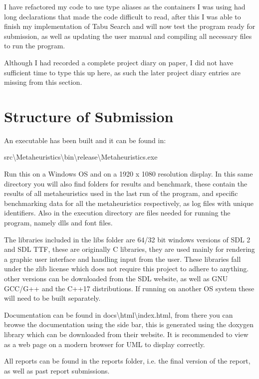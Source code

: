 \documentclass[]{final_report}
\begin{document}
I have refactored my code to use type aliases as the containers I was using had long declarations that made the code difficult to read, after this I was able to finish my implementation of Tabu Search and will now test the program ready for submission, as well as updating the user manual and compiling all necessary files to run the program.

Although I had recorded a complete project diary on paper, I did not have sufficient time to type this up here, as such the later project diary entries are missing from this section.

\newpage
\section*{Structure of Submission}

An executable has been built and it can be found in:

src\textbackslash Metaheuristics\textbackslash bin\textbackslash release\textbackslash Metaheuristics.exe

Run this on a Windows OS and on a 1920 x 1080 resolution display.
In this same directory you will also find folders for results and benchmark,
these contain the results of all metaheuristics used in the last run of the program,
and specific benchmarking data for all the metaheuristics respectively,
as log files with unique identifiers.
Also in the execution directory are files needed for running the program,
namely dlls and font files.

The libraries included in the libs folder are 64/32 bit windows versions of SDL 2 and SDL TTF,
these are originally C libraries,
they are used mainly for rendering a graphic user interface and handling input from the user.
These libraries fall under the zlib license which does not require this project to adhere to anything.
other versions can be downloaded from the SDL website,
as well as GNU GCC/G++ and the C++17 distributions.
If running on another OS system these will need to be built separately.

Documentation can be found in docs\textbackslash html\textbackslash index.html,
from there you can browse the documentation using the side bar,
this is generated using the doxygen library which can be downloaded from their website.
It is recommended to view as a web page on a modern browser for UML to display correctly.

All reports can be found in the reports folder,
i.e. the final version of the report, as well as past report submissions.
\end{document}
